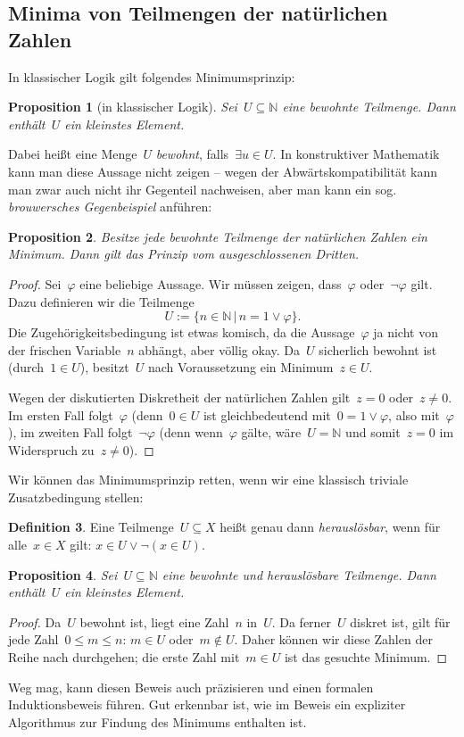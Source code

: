 \documentclass[a4paper,ngerman,12pt]{scrartcl}
\theoremstyle{definition}
\newtheorem{defn}{Definition}[section]
\theoremstyle{plain}
\newtheorem{prop}[defn]{Proposition}
\theoremstyle{remark}
\newcommand{\NN}{\mathbb{N}}
\renewcommand{\_}{\mathpunct{.}\,}
\newcommand{\?}{\,{:}\,}
\begin{document}
\subsection{Minima von Teilmengen der natürlichen Zahlen}

In klassischer Logik gilt folgendes Minimumsprinzip:
\begin{prop}[in klassischer Logik]Sei~$U \subseteq \NN$ eine bewohnte
Teilmenge. Dann enthält~$U$ ein kleinstes Element.\end{prop}
Dabei heißt eine Menge~$U$ \emph{bewohnt}, falls~$\exists u \in U$.
In konstruktiver Mathematik kann man diese Aussage nicht zeigen -- wegen der
Ab\-wärts\-kom\-pa\-ti\-bi\-li\-tät kann man zwar auch nicht ihr Gegenteil
nachweisen, aber man kann ein sog. \emph{brouwersches Gegenbeispiel}
anführen:
\begin{prop}Besitze jede bewohnte Teilmenge der natürlichen Zahlen ein Minimum.
Dann gilt das Prinzip vom ausgeschlossenen Dritten.\end{prop}
\begin{proof}Sei~$\varphi$ eine beliebige Aussage. Wir müssen zeigen,
dass~$\varphi$ oder~$\neg\varphi$ gilt. Dazu definieren wir die Teilmenge
\[ U := \{ n \in \NN \,|\, n = 1 \vee \varphi \}. \]
Die Zugehörigkeitsbedingung ist etwas komisch, da die Aussage~$\varphi$ ja
nicht von der frischen Variable~$n$ abhängt, aber völlig okay. Da~$U$
sicherlich bewohnt ist (durch~$1 \in U$), besitzt~$U$ nach Voraussetzung ein
Minimum~$z \in U$.

Wegen der diskutierten Diskretheit der natürlichen Zahlen gilt~$z = 0$ oder~$z
\neq 0$. Im ersten Fall folgt~$\varphi$ (denn~$0 \in U$ ist gleichbedeutend
mit~$0 = 1 \vee \varphi$, also mit~$\varphi$), im zweiten Fall folgt~$\neg\varphi$ (denn
wenn~$\varphi$ gälte, wäre~$U = \NN$ und somit~$z = 0$ im Widerspruch zu~$z
\neq 0$).\end{proof}

Wir können das Minimumsprinzip retten, wenn wir eine klassisch triviale
Zusatzbedingung stellen:
\begin{defn}Eine Teilmenge~$U \subseteq X$ heißt genau dann
\emph{herauslösbar}, wenn für alle~$x \in X$ gilt: $x \in U \vee \neg(x \in
U)$.\end{defn}
\begin{prop}Sei~$U \subseteq \NN$ eine bewohnte und herauslösbare Teilmenge.
Dann enthält~$U$ ein kleinstes Element.\end{prop}
\begin{proof}Da~$U$ bewohnt ist, liegt eine Zahl~$n$ in~$U$. Da ferner~$U$
diskret ist, gilt für jede Zahl~$0 \leq m \leq n$: $m \in U$ oder~$m \not\in
U$. Daher können wir diese Zahlen der Reihe nach durchgehen; die erste Zahl
mit~$m \in U$ ist das gesuchte Minimum.
\end{proof}
Weg mag, kann diesen Beweis auch präzisieren und einen formalen
Induktionsbeweis führen. Gut erkennbar ist, wie im Beweis ein expliziter
Algorithmus zur Findung des Minimums enthalten ist.
\end{document}
